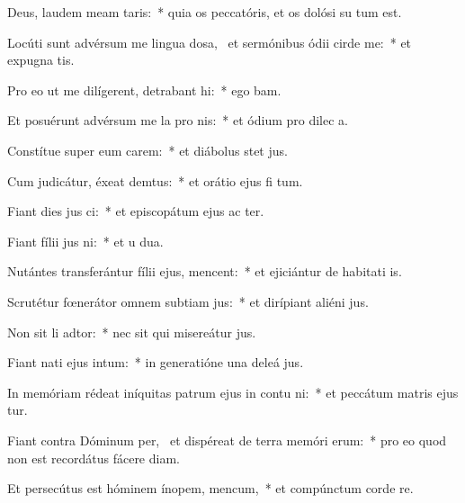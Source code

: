 \item Deus, laudem meam  taris:~* quia os peccatóris, et os dolósi su  tum est.
\item Locúti sunt advérsum me lingua dosa,~\pscross{} et sermónibus ódii cirde me:~* et expugna  tis.
\item Pro eo ut me dilígerent, detrabant hi:~* ego  bam.
\item Et posuérunt advérsum me la pro nis:~* et ódium pro dilec a.
\item Constítue super eum carem:~* et diábolus stet   jus.
\item Cum judicátur, éxeat demtus:~* et orátio ejus fi  tum.
\item Fiant dies jus ci:~* et episcopátum ejus ac ter.
\item Fiant fílii jus ni:~* et u  dua.
\item Nutántes transferántur fílii ejus,  mencent:~* et ejiciántur de habitati is.
\item Scrutétur fœnerátor omnem subtiam jus:~* et dirípiant aliéni  jus.
\item Non sit li adtor:~* nec sit qui misereátur  jus.
\item Fiant nati ejus  intum:~* in generatióne una deleá  jus.
\item In memóriam rédeat iníquitas patrum ejus in contu ni:~* et peccátum matris ejus  tur.
\item Fiant contra Dóminum per,~\pscross{} et dispéreat de terra memóri erum:~* pro eo quod non est recordátus fácere diam.
\item Et persecútus est hóminem ínopem,  mencum,~* et compúnctum corde re.
